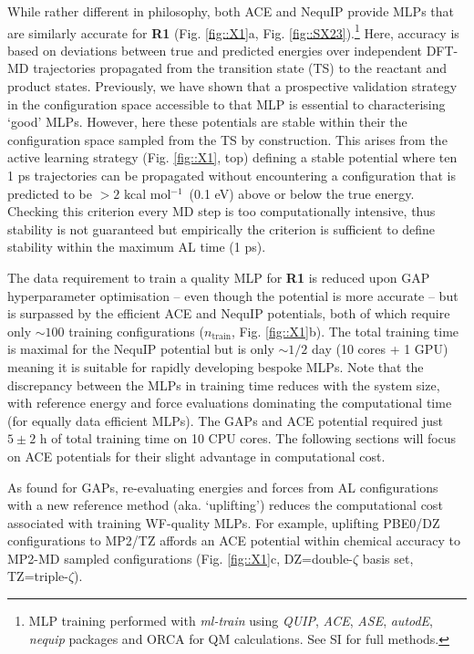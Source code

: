 \documentclass[twoside,twocolumn,9pt]{article}
\newcommand{\kcal}{kcal mol$^{-1}$}
\begin{document}
While rather different in philosophy, both ACE and NequIP provide MLPs that are similarly accurate for {\bfseries{R1}} (Fig. \ref{fig::X1}a, Fig. \ref{fig::SX23}).\footnote[4]{MLP training performed with \emph{ml-train}\cite{Young2021mlt} using \emph{QUIP},\cite{Csanyi_libAtoms_QUIP_2021} \emph{ACE},\cite{Ortner_ACE} \emph{ASE},\cite{HjorthLarsen2017} \emph{autodE},\cite{autodE} \emph{nequip}\cite{nequip_github} packages and ORCA\cite{Neese2017} for QM calculations. See SI for full methods.} Here, accuracy is based on deviations between true and predicted energies over independent DFT-MD trajectories propagated from the transition state (TS) to the reactant and product states. Previously, we have shown that a prospective validation strategy in the configuration space accessible to that MLP is essential to characterising `good’ MLPs.\cite{Young2021gap} However, here these potentials are stable within their the configuration space sampled from the TS by construction. This arises from the active learning strategy (Fig. \ref{fig::X1}, top) defining a stable potential where ten 1 ps trajectories can be propagated without encountering a configuration that is predicted to be $>2$ \kcal~(0.1 eV) above or below the true energy. Checking this criterion every MD step is too computationally intensive, thus stability is not guaranteed but empirically the criterion is sufficient to define stability within the maximum AL time (1 ps).


The data requirement to train a quality MLP for {\bfseries{R1}} is reduced upon GAP hyperparameter optimisation – even though the potential is more accurate – but is surpassed by the efficient ACE and NequIP potentials, both of which require only $\sim100$ training configurations ($n_\text{train}$, Fig. \ref{fig::X1}b). The total training time is maximal for the NequIP potential but is only $\sim1/2$ day (10 cores + 1 GPU) meaning it is suitable for rapidly developing bespoke MLPs. Note that the discrepancy between the MLPs in training time reduces with the system size, with reference energy and force evaluations dominating the computational time (for equally data efficient MLPs). The GAPs and ACE potential required just $5\pm2$ h of total training time on 10 CPU cores. The following sections will focus on ACE potentials for their slight advantage in computational cost.


As found for GAPs, re-evaluating energies and forces from AL configurations with a new reference method (aka. `uplifting’) reduces the computational cost associated with training WF-quality MLPs. For example, uplifting PBE0/DZ configurations to MP2/TZ affords an ACE potential within chemical accuracy to MP2-MD sampled configurations (Fig. \ref{fig::X1}c, DZ=double-$\zeta$ basis set, TZ=triple-$\zeta$).
\end{document}
